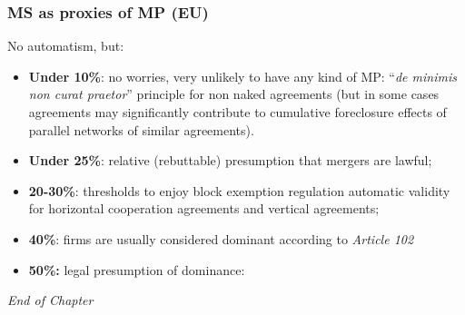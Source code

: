         \subsubsection{MS as proxies of MP (EU)}

            No automatism, but:
                \begin{itemize}
                    \item \textbf{Under 10\%}: no worries, very unlikely to have any kind of MP: “\textit{de minimis non curat praetor}” principle for non naked agreements (but in some cases agreements may significantly contribute to cumulative foreclosure effects of parallel networks of similar agreements).
                    \item \textbf{Under 25\%}: relative (rebuttable) presumption that mergers are lawful;
                    \item \textbf{20-30\%}: thresholds to enjoy block exemption regulation automatic validity for horizontal cooperation agreements and vertical agreements;
                    \item \textbf{40\%}: firms are usually considered dominant according to \textit{Article 102}
                    \item \textbf{50\%:} legal presumption of dominance:
                    
                        
                \end{itemize}

\emph{End of Chapter}